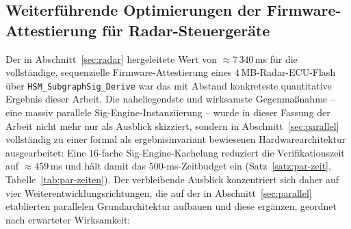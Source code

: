﻿\documentclass[a4paper,12pt]{article}
\theoremstyle{definition}
\begin{document}
\subsection{Weiterführende Optimierungen der Firmware-Attestierung für Radar-Steuergeräte}
\label{sec:ausblick-radar}

Der in Abschnitt~\ref{sec:radar} hergeleitete Wert von $\approx 7\,340$\,ms für die vollständige, sequenzielle Firmware-Attestierung eines $4$\,MB-Radar-ECU-Flash über \texttt{HSM\_SubgraphSig\_Derive} war das mit Abstand konkreteste quantitative Ergebnis dieser Arbeit. Die naheliegendste und wirksamste Gegenmaßnahme -- eine massiv parallele Sig-Engine-Instanziierung -- wurde in dieser Fassung der Arbeit nicht mehr nur als Ausblick skizziert, sondern in Abschnitt~\ref{sec:parallel} vollständig zu einer formal als ergebnisinvariant bewiesenen Hardwarearchitektur ausgearbeitet: Eine $16$-fache Sig-Engine-Kachelung reduziert die Verifikationszeit auf $\approx 459$\,ms und hält damit das $500$-ms-Zeitbudget ein (Satz~\ref{satz:par-zeit}, Tabelle~\ref{tab:par-zeiten}). Der verbleibende Ausblick konzentriert sich daher auf vier Weiterentwicklungsrichtungen, die auf der in Abschnitt~\ref{sec:parallel} etablierten parallelen Grundarchitektur aufbauen und diese ergänzen, geordnet nach erwarteter Wirksamkeit:
\end{document}
